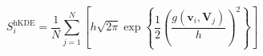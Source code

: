 \begin{equation}
    \label{eq:ad_kde_h}
    S_i^{\text{hKDE}} = \frac{1}{N}\sum_{j = 1}^{N}\left[h\sqrt{2\pi}\exp\left\lbrace\frac{1}{2}\left(\frac{g(\bm{v}_i,\bm{V}_j)}{h}\right)^2\right\rbrace\right]
\end{equation}
